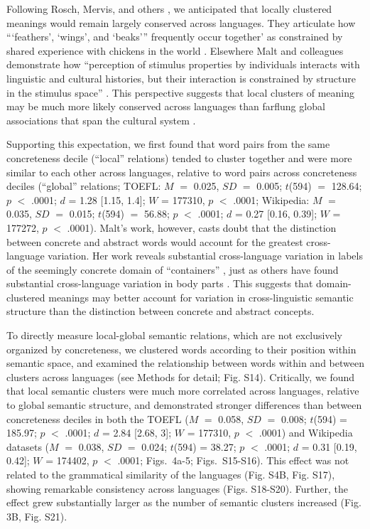 \documentclass[9pt,twocolumn,twoside,lineno]{pnas-new}
\begin{document}
Following Rosch, Mervis, and others \cite{rosch1975family}, we anticipated that locally clustered meanings would remain largely conserved across languages. They articulate how ```feathers', `wings', and `beaks''' frequently occur together' as constrained by shared experience with chickens in the world \cite{rosch1975family}. Elsewhere Malt and colleagues demonstrate how ``perception of stimulus properties by individuals interacts with linguistic and cultural histories, but their interaction is constrained by structure in the stimulus space'' \cite{Malt2003-vv,xu2020conceptual}. This perspective suggests that local clusters of meaning may be much more likely conserved across languages than farflung global associations that span the cultural system \cite[e.g.][]{lakoff2008women}. 

Supporting this expectation, we first found that word pairs from the same concreteness decile (``local'' relations) tended to cluster together and were more similar to each other across languages, relative to word pairs across concreteness deciles (``global'' relations; TOEFL:  $M$  $=$ 0.025, $SD$ $=$  0.005; $t$(594) $=$ 128.64; $p$ $<$ .0001; $d$ = 1.28 [1.15, 1.4];  $W$ = 177310, $p$ $<$ .0001; Wikipedia: $M$  $=$ 0.035, $SD$  $=$  0.015; $t$(594) $=$ 56.88; $p$ $<$ .0001;  $d$ = 0.27 [0.16, 0.39];  $W$ = 177272, $p$ $<$ .0001). Malt's work, however, casts doubt that the distinction between concrete and abstract words would account for the greatest cross-language variation. Her work reveals substantial cross-language variation in labels of the seemingly concrete domain of ``containers'' \cite{malt1999knowing, Malt2003-vv}, just as others have found substantial cross-language variation in body parts \cite{majid2015semantic, Levinson2006-bs}. This suggests that domain-clustered meanings may better account for variation in cross-linguistic semantic structure than the distinction between concrete and abstract concepts. 

To directly measure local-global semantic relations, which are not exclusively organized by concreteness, we clustered words according to their position within semantic space, and examined the relationship between words within and between clusters across languages (see Methods for detail; Fig. S14). Critically, we found that local semantic clusters were much more correlated across languages, relative to global semantic structure, and demonstrated stronger differences than between concreteness deciles in both the TOEFL ($M$  $=$ 0.058, $SD$ $=$  0.008;  $t$(594) = 185.97; $p$ $<$ .0001; $d$ = 2.84 [2.68, 3]; $W$ = 177310, $p$ $<$ .0001) and Wikipedia datasets ($M$  $=$ 0.038, $SD$  $=$  0.024; $t$(594) = 38.27; $p$ $<$ .0001;  $d$ = 0.31 [0.19, 0.42]; $W$ = 174402, $p$ $<$ .0001;  Figs.\ 4a-5; Figs.\ S15-S16). This effect was not related to the grammatical similarity of the languages (Fig. S4B, Fig. S17), showing remarkable consistency across languages (Figs. S18-S20). Further, the effect grew substantially larger as the number of semantic clusters increased (Fig. 3B, Fig. S21). 
\end{document}
